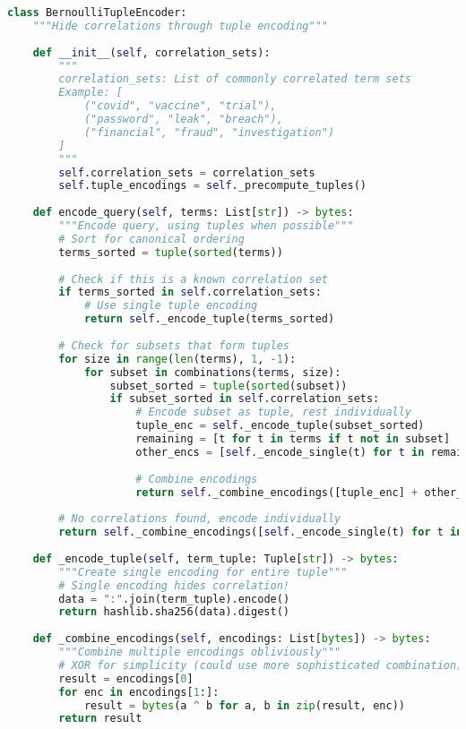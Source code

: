 \begin{lstlisting}[language=Python, caption={Generalized tuple encoding}]
class BernoulliTupleEncoder:
    """Hide correlations through tuple encoding"""
    
    def __init__(self, correlation_sets):
        """
        correlation_sets: List of commonly correlated term sets
        Example: [
            ("covid", "vaccine", "trial"),
            ("password", "leak", "breach"),
            ("financial", "fraud", "investigation")
        ]
        """
        self.correlation_sets = correlation_sets
        self.tuple_encodings = self._precompute_tuples()
    
    def encode_query(self, terms: List[str]) -> bytes:
        """Encode query, using tuples when possible"""
        # Sort for canonical ordering
        terms_sorted = tuple(sorted(terms))
        
        # Check if this is a known correlation set
        if terms_sorted in self.correlation_sets:
            # Use single tuple encoding
            return self._encode_tuple(terms_sorted)
        
        # Check for subsets that form tuples
        for size in range(len(terms), 1, -1):
            for subset in combinations(terms, size):
                subset_sorted = tuple(sorted(subset))
                if subset_sorted in self.correlation_sets:
                    # Encode subset as tuple, rest individually
                    tuple_enc = self._encode_tuple(subset_sorted)
                    remaining = [t for t in terms if t not in subset]
                    other_encs = [self._encode_single(t) for t in remaining]
                    
                    # Combine encodings
                    return self._combine_encodings([tuple_enc] + other_encs)
        
        # No correlations found, encode individually
        return self._combine_encodings([self._encode_single(t) for t in terms])
    
    def _encode_tuple(self, term_tuple: Tuple[str]) -> bytes:
        """Create single encoding for entire tuple"""
        # Single encoding hides correlation!
        data = ":".join(term_tuple).encode()
        return hashlib.sha256(data).digest()
    
    def _combine_encodings(self, encodings: List[bytes]) -> bytes:
        """Combine multiple encodings obliviously"""
        # XOR for simplicity (could use more sophisticated combination)
        result = encodings[0]
        for enc in encodings[1:]:
            result = bytes(a ^ b for a, b in zip(result, enc))
        return result
\end{lstlisting}

